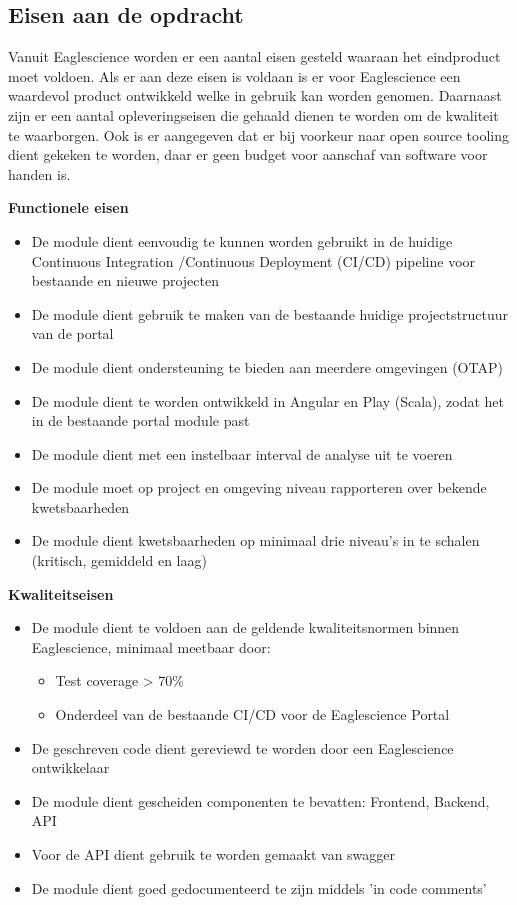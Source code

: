 \subsection{Eisen aan de opdracht}\label{subsec: eisen-aan-de-opdracht}
Vanuit Eaglescience worden er een aantal eisen gesteld waaraan het eindproduct moet voldoen. Als er aan deze eisen is voldaan is er voor Eaglescience een waardevol product ontwikkeld welke in gebruik kan worden genomen. Daarnaast zijn er een aantal opleveringseisen die gehaald dienen te worden om de kwaliteit te waarborgen. Ook is er aangegeven dat er bij voorkeur naar open source tooling dient gekeken te worden, daar er geen budget voor aanschaf van software voor handen is.
\newpage

\textbf{Functionele eisen}
\begin{itemize}
\item De module dient eenvoudig te kunnen worden gebruikt in de huidige Continuous Integration /Continuous Deployment (CI/CD) pipeline voor bestaande en nieuwe projecten
\item De module dient gebruik te maken van de bestaande huidige projectstructuur van de portal
\item De module dient ondersteuning te bieden aan meerdere omgevingen (OTAP)
\item De module dient te worden ontwikkeld in Angular en Play (Scala), zodat het in de bestaande portal module past
\item De module dient met een instelbaar interval de analyse uit te voeren
\item De module moet op project en omgeving niveau rapporteren over bekende kwetsbaarheden
\item De module dient kwetsbaarheden op minimaal drie niveau’s in te schalen (kritisch, gemiddeld en laag)
\end{itemize}
\textbf{Kwaliteitseisen}
\begin{itemize}
\item De module dient te voldoen aan de geldende kwaliteitsnormen binnen Eaglescience, minimaal meetbaar door:
	\begin{itemize}
	\item Test coverage > 70\%
	\item Onderdeel van de bestaande CI/CD voor de Eaglescience Portal
	\end{itemize}
\item De geschreven code dient gereviewd te worden door een Eaglescience ontwikkelaar
\item De module dient gescheiden componenten te bevatten: Frontend, Backend, API
\item Voor de API dient gebruik te worden gemaakt van swagger
\item De module dient goed gedocumenteerd te zijn middels 'in code comments'
\end{itemize}

